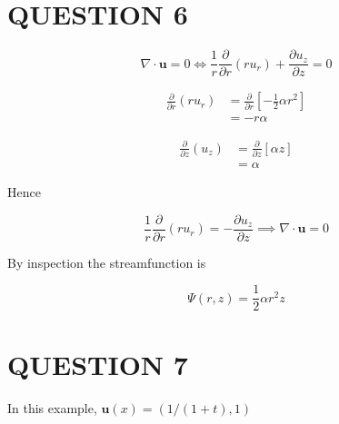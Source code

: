 \documentclass[a4paper]{article}
\begin{document}
\section{QUESTION 6}

\[ \nabla \cdot \mathbf{u} = 0 \iff  \frac{1}{r} \frac{\partial }{\partial r}(ru_{r}) + \frac{\partial u_{z}}{\partial z} = 0  \]


\begin{align*}
\frac{\partial }{\partial r}(ru_{r}) & = \frac{\partial }{\partial r} \left[ - \frac{1}{2} \alpha r^{2} \right]     \\
& = - r \alpha
\end{align*}

\begin{align*}
\frac{\partial }{\partial z}(u_{z}) & = \frac{\partial }{\partial z} \left[ \alpha z \right]    \\
& = \alpha
\end{align*}

Hence 

\[  \frac{1}{r} \frac{\partial }{\partial r}(ru_{r}) = - \frac{\partial u_{z}}{\partial z} \implies \nabla \cdot \mathbf{u} = 0  \]


By inspection the streamfunction is

\[ \Psi(r,z) = \frac{1}{2} \alpha r^{2} z  \]






\section{QUESTION 7}


In this example, $ \mathbf{u}(x) = (  1/(1+t), 1  ) $
\end{document}
